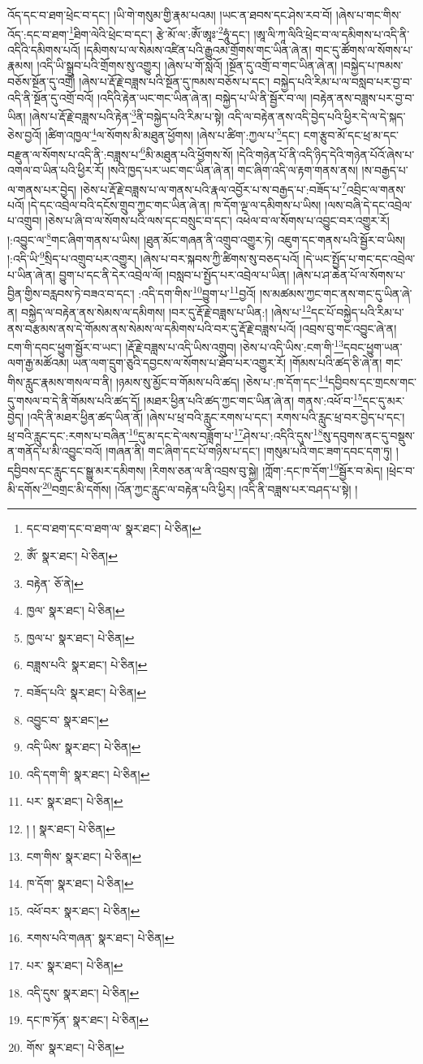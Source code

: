 འོད་དང་བ་ཐག་ཕྲེང་བ་དང་། །ཡི་གེ་གསུམ་གྱི་རྣམ་པའམ། །ཡང་ན་ཐབས་དང་ཤེས་རབ་བོ། །ཞེས་པ་གང་གིས་འོད་:དང་བ་ཐག་\footnote{དང་བ་ཐག་དང་བ་ཐག་ལ་  སྣར་ཐང་།  པེ་ཅིན། }ཐིག་ལེའི་ཕྲེང་བ་དང་། རྩེ་མོ་ལ་:ཨོཾ་ཨཱཿ་\footnote{ཨོཾ་  སྣར་ཐང་།  པེ་ཅིན། }ཧཱུཾ་དང་། །ཨཱ་ལི་ཀཱ་ལིའི་ཕྲེང་བ་ལ་དམིགས་པ་འདི་ནི་འདིའི་དམིགས་པའོ། །དམིགས་པ་ལ་སེམས་འཛིན་པའི་རྒྱུའམ་གྲོགས་གང་ཡིན་ཞེ་ན། གང་དུ་ཚོགས་ལ་སོགས་པ་རྣམས། །འདི་ཡི་སྒྲུབ་པའི་གྲོགས་སུ་འགྱུར། །ཞེས་པ་གོ་སླའོ། །སྔོན་དུ་འགྲོ་བ་གང་ཡིན་ཞེ་ན། །བསྐྱེད་པ་ཁམས་བཅོས་སྔོན་དུ་འགྲོ། །ཞེས་པ་རྡོ་རྗེ་བཟླས་པའི་སྔོན་དུ་ཁམས་བཅོས་པ་དང་། བསྐྱེད་པའི་རིམ་པ་ལ་བསླབ་པར་བྱ་བ་འདི་ནི་སྔོན་དུ་འགྲོ་བའོ། །འདིའི་རྟེན་ཡང་གང་ཡིན་ཞེ་ན། བསྐྱེད་པ་ཡི་ནི་སྦྱོར་བ་ལ། །བརྟེན་ནས་བཟླས་པར་བྱ་བ་ཡིན། །ཞེས་པ་རྡོ་རྗེ་བཟླས་པའི་རྟེན་\footnote{བརྟེན་  ཅོ་ནེ། }ནི་བསྐྱེད་པའི་རིམ་པ་སྟེ། འདི་ལ་བརྟེན་ནས་འདི་བྱེད་པའི་ཕྱིར་དེ་ལ་དེ་སྐད་ཅེས་བྱའོ། །ཚིག་འཁྱལ་\footnote{ཁྱལ་  སྣར་ཐང་།  པེ་ཅིན། }ལ་སོགས་མི་མཐུན་ཕྱོགས། །ཞེས་པ་ཚིག་:ཀྱལ་པ་\footnote{ཁྱལ་པ་  སྣར་ཐང་།  པེ་ཅིན། }དང་། ངག་རྩུབ་མོ་དང་ཕྲ་མ་དང་བརྫུན་ལ་སོགས་པ་འདི་ནི་:བཟླས་པ་\footnote{བཟླས་པའི་  སྣར་ཐང་།  པེ་ཅིན། }མི་མཐུན་པའི་ཕྱོགས་སོ། །དེའི་གཉེན་པོ་ནི་འདི་ཉིད་དེའི་གཉེན་པོའོ་ཞེས་པ་འགལ་བ་ཡིན་པའི་ཕྱིར་རོ། །སའི་ཁྱད་པར་ཡང་གང་ཡིན་ཞེ་ན། གང་ཞིག་འདི་ལ་རྟག་གནས་ནས། །ས་བརྒྱད་པ་ལ་གནས་པར་བྱེད། །ཅེས་པ་རྡོ་རྗེ་བཟླས་པ་ལ་གནས་པའི་རྣལ་འབྱོར་པ་ས་བརྒྱད་པ་:བཟོད་པ་\footnote{བཟོད་པའི་  སྣར་ཐང་།  པེ་ཅིན། }འབྲིང་ལ་གནས་པའོ། །དེ་དང་འབྲེལ་བའི་དངོས་གྲུབ་ཀྱང་གང་ཡིན་ཞེ་ན། ཁ་དོག་ལྔ་ལ་དམིགས་པ་ཡིས། །ལས་བཞི་དེ་དང་འབྲེལ་པ་འགྲུབ། །ཅེས་པ་ཞི་བ་ལ་སོགས་པའི་ལས་དང་བསྲུང་བ་དང་། འཕེལ་བ་ལ་སོགས་པ་འབྱུང་བར་འགྱུར་རོ། །:འབྱུང་ལ་\footnote{འབྱུང་བ་  སྣར་ཐང་། }གང་ཞིག་གནས་པ་ཡིས། །ཐུན་མོང་གཞན་ནི་འགྲུབ་འགྱུར་ཏེ། འཇུག་དང་གནས་པའི་སྦྱོར་བ་ཡིས། །:འདི་ཡི་\footnote{འདི་ཡིས་  སྣར་ཐང་།  པེ་ཅིན། }སྲིད་པ་འགྲུབ་པར་འགྱུར། །ཞེས་པ་བར་སྐབས་ཀྱི་ཚིགས་སུ་བཅད་པའོ། །དེ་ཡང་སྤྱོད་པ་གང་དང་འབྲེལ་པ་ཡིན་ཞེ་ན། བྱུག་པ་དང་ནི་དེར་འབྲེལ་ལོ། །བསླབ་པ་སྤྱོད་པར་འབྲེལ་པ་ཡིན། །ཞེས་པ་ཤ་ཆེན་པོ་ལ་སོགས་པ་བྱིན་གྱིས་བརླབས་ཏེ་བཟའ་བ་དང་། :འདི་དག་གིས་\footnote{འདི་དག་གི་  སྣར་ཐང་།  པེ་ཅིན། }བྱུག་པ་\footnote{པར་  སྣར་ཐང་།  པེ་ཅིན། }བྱའོ། །ས་མཚམས་ཀྱང་གང་ནས་གང་དུ་ཡིན་ཞེ་ན། བསྐྱེད་ལ་བརྟེན་ནས་སེམས་ལ་དམིགས། །བར་དུ་རྡོ་རྗེ་བཟླས་པ་ཡིན:། །ཞེས་པ་\footnote{། །  སྣར་ཐང་།  པེ་ཅིན། }དང་པོ་བསྐྱེད་པའི་རིམ་པ་ནས་བརྩམས་ནས་དེ་གོམས་ནས་སེམས་ལ་དམིགས་པའི་བར་དུ་རྡོ་རྗེ་བཟླས་པའོ། །འབྲས་བུ་གང་འབྱུང་ཞེ་ན། ངག་གི་དབང་ཕྱུག་སྦྱོར་བ་ཡང་། །རྡོ་རྗེ་བཟླས་པ་འདི་ཡིས་འགྲུབ། །ཅེས་པ་འདི་ཡིས་:ངག་གི་\footnote{ངག་གིས་  སྣར་ཐང་།  པེ་ཅིན། }དབང་ཕྱུག་ཡན་ལག་རྒྱ་མཚོའམ། ཡན་ལག་དྲུག་ཅུའི་དབྱངས་ལ་སོགས་པ་ཐོབ་པར་འགྱུར་རོ། །གོམས་པའི་ཚད་ཅི་ཞེ་ན། གང་གིས་རླུང་རྣམས་གསལ་བ་ནི། །ཉམས་སུ་མྱོང་བ་གོམས་པའི་ཚད། །ཅེས་པ་:ཁ་དོག་དང་\footnote{ཁ་དོག་  སྣར་ཐང་།  པེ་ཅིན། }དབྱིབས་དང་གྲངས་གང་དུ་གསལ་བ་དེ་ནི་གོམས་པའི་ཚད་དོ། །མཐར་ཕྱིན་པའི་ཚད་ཀྱང་གང་ཡིན་ཞེ་ན། གནས་:འཕོ་བ་\footnote{འཕོ་བར་  སྣར་ཐང་།  པེ་ཅིན། }དང་དུ་མར་བྱེད། །འདི་ནི་མཐར་ཕྱིན་ཚད་ཡིན་ནོ། །ཞེས་པ་ཕྲ་བའི་རླུང་རགས་པ་དང་། རགས་པའི་རླུང་ཕྲ་བར་བྱེད་པ་དང་། ཕྲ་བའི་རླུང་དང་:རགས་པ་བཞིན་\footnote{རགས་པའི་གཞན་  སྣར་ཐང་།  པེ་ཅིན། }དུ་མ་དང་དེ་ལས་བཟློག་པ་\footnote{པར་  སྣར་ཐང་།  པེ་ཅིན། }ཤེས་པ་:འདིའི་དུས་\footnote{འདི་དུས་  སྣར་ཐང་།  པེ་ཅིན། }སུ་དབུགས་ནང་དུ་བསྡུས་ན་གནོད་པ་མི་འབྱུང་བའོ། །གཞན་ནི། གང་ཞིག་དང་པོ་གཉིས་པ་དང་། །གསུམ་པའི་གང་ཟག་དབང་དག་ཏུ། །དབྱིབས་དང་རླུང་དང་སྒྱུ་མར་དམིགས། །རིགས་ཅན་ལ་ནི་འབྲས་བུ་སྐྱེ། །ཀློག་:དང་ཁ་དོག་\footnote{དང་ཁ་ཏོན་  སྣར་ཐང་།  པེ་ཅིན། }སྦྱོར་བ་མེད། །ཕྲེང་བ་མི་དགོས་\footnote{གོས་  སྣར་ཐང་།  པེ་ཅིན། }བགྲང་མི་དགོས། །འོན་ཀྱང་རླུང་ལ་བརྟེན་པའི་ཕྱིར། །འདི་ནི་བཟླས་པར་བཤད་པ་སྟེ། །
